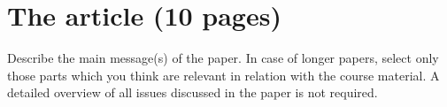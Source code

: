 \section{The article (10 pages)}
Describe the main message(s) of the paper. In case of longer papers, select only those parts which you think are relevant in relation with the course material. A detailed overview of all issues discussed in the paper is not required.
